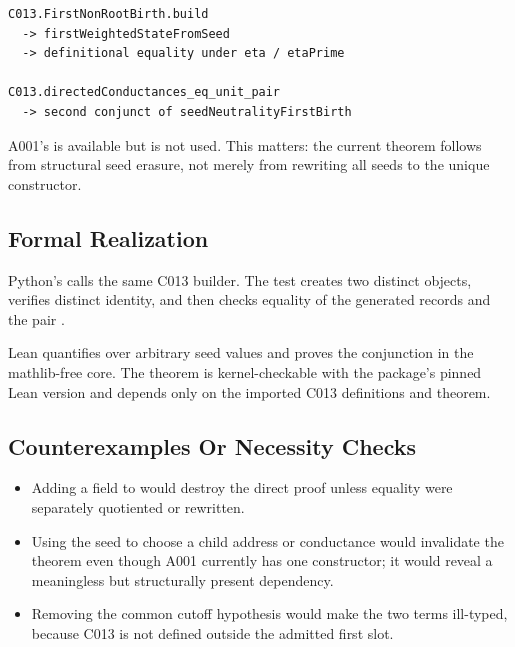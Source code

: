 \begin{verbatim}
C013.FirstNonRootBirth.build
  -> firstWeightedStateFromSeed
  -> definitional equality under eta / etaPrime

C013.directedConductances_eq_unit_pair
  -> second conjunct of seedNeutralityFirstBirth
\end{verbatim}

A001's \texttt{\protect{}} is available but is not used. This matters:
the current theorem follows from structural seed erasure, not merely
from rewriting all seeds to the unique constructor.

\subsection{Formal Realization}\label{formal-realization-2}

Python's \texttt{\protect{}} calls the same C013
builder. The test creates two distinct \texttt{\protect{}} objects,
verifies distinct identity, and then checks equality of the generated
records and the pair \texttt{\protect{}}.

Lean quantifies over arbitrary seed values and proves the conjunction in
the mathlib-free core. The theorem is kernel-checkable with the
package's pinned Lean version and depends only on the imported C013
definitions and theorem.

\subsection{Counterexamples Or Necessity
Checks}\label{counterexamples-or-necessity-checks-2}

\begin{itemize}
\tightlist
\item
  Adding a \texttt{\protect{}} field to \texttt{\protect{}} would
  destroy the direct \texttt{\protect{}} proof unless equality were separately
  quotiented or rewritten.
\item
  Using the seed to choose a child address or conductance would
  invalidate the theorem even though A001 currently has one constructor;
  it would reveal a meaningless but structurally present dependency.
\item
  Removing the common cutoff hypothesis would make the two terms
  ill-typed, because C013 is not defined outside the admitted first
  slot.
\end{itemize}

